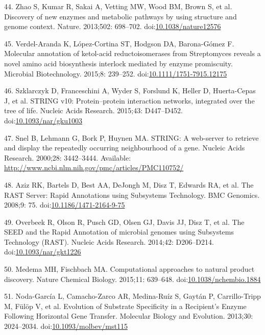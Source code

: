\documentclass[12pt,twoside]{reedthesis}
\begin{document}
  \hypertarget{ref-zhaoux5fdiscoveryux5f2013}{}
  44. Zhao S, Kumar R, Sakai A, Vetting MW, Wood BM, Brown S, et al.
  Discovery of new enzymes and metabolic pathways by using structure and
  genome context. Nature. 2013;502: 698--702.
  doi:\href{https://doi.org/10.1038/nature12576}{10.1038/nature12576}
  
  \hypertarget{ref-verdel-arandaux5fmolecularux5f2015}{}
  45. Verdel-Aranda K, López-Cortina ST, Hodgson DA, Barona-Gómez F.
  Molecular annotation of ketol-acid reductoisomerases from Streptomyces
  reveals a novel amino acid biosynthesis interlock mediated by enzyme
  promiscuity. Microbial Biotechnology. 2015;8: 239--252.
  doi:\href{https://doi.org/10.1111/1751-7915.12175}{10.1111/1751-7915.12175}
  
  \hypertarget{ref-szklarczykux5fstringux5f2015}{}
  46. Szklarczyk D, Franceschini A, Wyder S, Forslund K, Heller D,
  Huerta-Cepas J, et al. STRING v10: Protein--protein interaction
  networks, integrated over the tree of life. Nucleic Acids Research.
  2015;43: D447--D452.
  doi:\href{https://doi.org/10.1093/nar/gku1003}{10.1093/nar/gku1003}
  
  \hypertarget{ref-snelux5fstring:ux5f2000}{}
  47. Snel B, Lehmann G, Bork P, Huynen MA. STRING: A web-server to
  retrieve and display the repeatedly occurring neighbourhood of a gene.
  Nucleic Acids Research. 2000;28: 3442--3444. Available:
  \url{http://www.ncbi.nlm.nih.gov/pmc/articles/PMC110752/}
  
  \hypertarget{ref-azizux5frastux5f2008}{}
  48. Aziz RK, Bartels D, Best AA, DeJongh M, Disz T, Edwards RA, et al.
  The RAST Server: Rapid Annotations using Subsystems Technology. BMC
  Genomics. 2008;9: 75.
  doi:\href{https://doi.org/10.1186/1471-2164-9-75}{10.1186/1471-2164-9-75}
  
  \hypertarget{ref-overbeekux5fseedux5f2014}{}
  49. Overbeek R, Olson R, Pusch GD, Olsen GJ, Davis JJ, Disz T, et al.
  The SEED and the Rapid Annotation of microbial genomes using Subsystems
  Technology (RAST). Nucleic Acids Research. 2014;42: D206--D214.
  doi:\href{https://doi.org/10.1093/nar/gkt1226}{10.1093/nar/gkt1226}
  
  \hypertarget{ref-medemaux5fcomputationalux5f2015}{}
  50. Medema MH, Fischbach MA. Computational approaches to natural product
  discovery. Nature Chemical Biology. 2015;11: 639--648.
  doi:\href{https://doi.org/10.1038/nchembio.1884}{10.1038/nchembio.1884}
  
  \hypertarget{ref-noda-garciaux5fevolutionux5f2013}{}
  51. Noda-García L, Camacho-Zarco AR, Medina-Ruíz S, Gaytán P,
  Carrillo-Tripp M, Fülöp V, et al. Evolution of Substrate Specificity in
  a Recipient's Enzyme Following Horizontal Gene Transfer. Molecular
  Biology and Evolution. 2013;30: 2024--2034.
  doi:\href{https://doi.org/10.1093/molbev/mst115}{10.1093/molbev/mst115}
  
\end{document}
